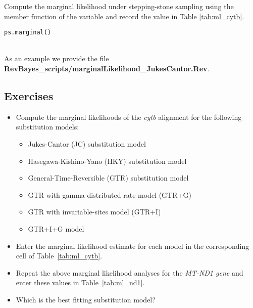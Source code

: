 Compute the marginal likelihood under stepping-stone sampling using the member function  of the  variable and record the value in Table \ref{tab:ml_cytb}.
{\tt \begin{snugshade*}
\begin{lstlisting}
ps.marginal() 
\end{lstlisting}
\end{snugshade*}}

\noindent \\ \impmark As an example we provide the file \textbf{RevBayes\_scripts/marginalLikelihood\_JukesCantor.Rev}.


\subsection{Exercises}

\begin{itemize}
\item Compute the marginal likelihoods of the \textit{cytb} alignment for the following substitution models:
\begin{itemize}
\item Jukes-Cantor (JC) substitution model
\item Hasegawa-Kishino-Yano (HKY) substitution model
\item General-Time-Reversible (GTR) substitution model
\item GTR with gamma distributed-rate model (GTR+G)
\item GTR with invariable-sites model  (GTR+I)
\item GTR+I+G model
\end{itemize}
\item Enter the marginal likelihood estimate for each model in the corresponding cell of Table~\ref{tab:ml_cytb}.
\item Repeat the above marginal likelihood analyses for the \textit{MT-ND1 gene} and enter these values in Table~\ref{tab:ml_nd1}.
\item Which is the best fitting substitution model?
\end{itemize}

